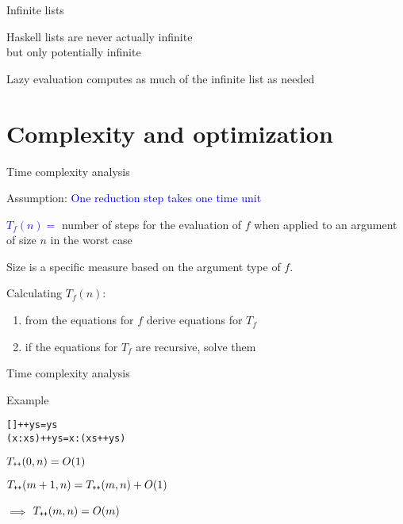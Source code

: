 \documentclass{beamer}
\def\code#1{\texttt{\frenchspacing#1}}
\begin{document}
\begin{frame}{Infinite lists}

\begin{block}{\centering Haskell lists are never actually infinite \\ but only potentially infinite}
\end{block}

\begin{block}{\centering Lazy evaluation computes as much of the infinite list as needed}
\end{block}

\end{frame}

\section{Complexity and optimization}

\begin{frame}{Time complexity analysis}

Assumption: \textcolor{blue}{One reduction step takes one time unit}

\pause

\vspace{0.5cm}
\textcolor{blue}{$T_f(n) = $} number of steps for the evaluation of $f$ when applied to an argument of size $n$ in the worst case

\pause

\vspace{0.5cm}
Size is a specific measure based on the argument type of $f$.

\pause

\vspace{0.5cm}
Calculating $T_f(n)$:
\begin{enumerate}
    \item from the equations for $f$ derive equations for $T_f$
    \item if the equations for $T_f$ are recursive, solve them
\end{enumerate}

\end{frame}

\begin{frame}[fragile]{Time complexity analysis}

\begin{exampleblock}{Example}
\begin{alltt}
[] ++ ys = ys
(x:xs) ++ ys = x : (xs ++ ys)
\end{alltt}

\pause

$T_{\code{++}}(0, n) = O(1)$ \par\pause
$T_{\code{++}}(m + 1, n) = T_{\code{++}}(m, n) + O(1)$ \par\pause
$\implies$ \textcolor{blue}{$T_{\code{++}}(m, n) = O(m)$}
\end{exampleblock}

\end{frame}
\end{document}
